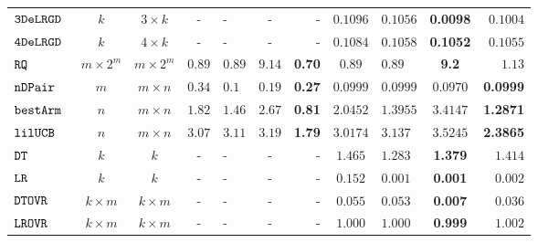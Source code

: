 {\begin {table}[t]
\begin{center}
{\begin{tabular}{|| >{\tiny}l || c | c || c | l | c | r || c | l | c | r || }
         \hhline{||-||---||-||--||----||}
         $  \mathtt{ 3DeLRGD }$ & $ k $ & $  3\times k $ & -  & - & - & - & $0.1096$   & $0.1056$ & \textbf{0.0098} & $0.1004$  \\
         \hhline{||-||---||-||--||----||}
         $  \mathtt{ 4DeLRGD }$ & $ k $ & $  4\times k $  & -  & - & - & -  & $0.1084$   & $0.1058$ & \textbf{0.1052} & $0.1055$   \\
         \hhline{||-||---||-||--||----||}
         $\mathtt{RQ}$~\cite{Jamieson2015TheAO} & $ m \times 2^m $ & $  m \times 2^m $  & $0.89$  & $0.89$ & $9.14$ & \textbf{0.70}  & $0.89$   & $0.89$ & \textbf{9.2} & $1.13$   \\
         \hhline{||-||---||-||--||----||}
         $\mathtt{nDPair}$~\cite{Jamieson2015TheAO} & $ m $ & $  m \times n  $  & $0.34$  & $0.1$ & $0.19$ & \textbf{0.27} & $0.0999$   & $0.0999$ & $0.0970$ & \textbf{0.0999}   \\
         \hhline{||-||---||-||--||----||}
         $\mathtt{bestArm}$~\cite{Jamieson2015TheAO} & $ n $ & $  m \times n $  & $1.82$  & $1.46$ & $2.67$ & \textbf{0.81} & $ 2.0452$   & $ 1.3955$ & {{$3.4147$}} & \textbf{1.2871}  \\
         \hhline{||-||---||-||--||----||}
         $\mathtt{lilUCB}$~\cite{Jamieson2015TheAO} & $ n $ & $ m \times n $ & $3.07$  & $3.11$ & $3.19$ & \textbf{1.79}  & $3.0174$   & $ 3.137$ & {$3.5245$} & \textbf{2.3865}   \\
         \hhline{||-||---||-||--||----||}
         $\mathtt{DT}$ & $k$ &  $k$  & -  & - & - & - & $ 1.465$  & $ 1.283$ & \textbf{1.379 } & {$1.414$}   \\
         \hhline{||-||---||-||--||----||}
         $\mathtt{LR}$ & $k$ &  $k$ & -  & - & - & -  & $ 0.152$  &  $ 0.001$ & {\textbf{0.001}} & {$0.002$}   \\
        \hhline{||-||---||-||--||----||}
        $\mathtt{DTOVR}$ & $k \times m$ &  $ k \times m $  & -  & - & - & - &  $0.055$ & $0.053$  &  {\textbf{0.007}} & $0.036$  \\
        \hhline{||-||---||-||--||----||}
        $\mathtt{LROVR}$  & $k \times m$ &  $ k \times m $  & -  & - & - & -  &  $ 1.000  $  &  $ 1.000 $ & {\textbf{ 0.999}} & $ 1.002 $  \\

\end{tabular}}
\end{center}
\end{table}}
